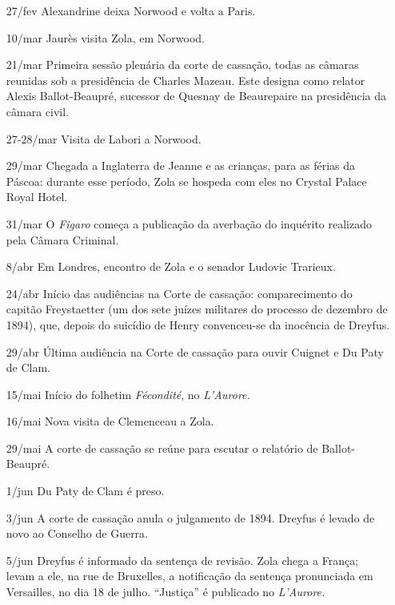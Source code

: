 \begin{itemize}
\item[27/fev] Alexandrine deixa Norwood e volta a Paris. 

\item[10/mar] Jaurès visita Zola, em Norwood.

\item[21/mar] Primeira sessão plenária da corte de cassação, todas as câmaras
reunidas sob a presidência de Charles Mazeau. Este designa como relator Alexis
Ballot-Beaupré, sucessor de Quesnay de Beaurepaire na presidência da câmara
civil.

\item[27-28/mar] Visita de Labori a Norwood.

\item[29/mar] Chegada a Inglaterra de Jeanne e as crianças, para as férias da
Páscoa: durante esse período, Zola se hospeda com eles no Crystal Palace Royal
Hotel.
 
\item[31/mar] O \textit{Figaro} começa a publicação da averbação do inquérito
realizado pela Câmara Criminal.

\item[8/abr] Em Londres, encontro de Zola e o senador Ludovic Trarieux.

\item[24/abr] Início das audiências na Corte de cassação: comparecimento do
capitão Freystaetter (um dos sete juízes militares do processo de dezembro de
1894), que, depois do suicídio de Henry convenceu-se da inocência de Dreyfus.

\item[29/abr] Última audiência na Corte de cassação para ouvir Cuignet e Du
Paty de Clam.

\item[15/mai] Início do folhetim \textit{Fécondité}, no \textit{L'Aurore.}

\item[16/mai] Nova visita de Clemenceau a Zola.

\item[29/mai] A corte de cassação se reúne para escutar o relatório de
Ballot-Beaupré.

\item[1/jun] Du Paty de Clam é preso.

\item[3/jun] A corte de cassação anula o julgamento de 1894. Dreyfus é levado
de novo ao Conselho de Guerra.

\item[5/jun] Dreyfus é informado da sentença de revisão. Zola chega a França;
levam a ele, na rue de Bruxelles, a notificação da sentença pronunciada em
Versailles, no dia 18 de julho. ``Justiça'' é publicado no \textit{ L'Aurore.}


\end{itemize}
